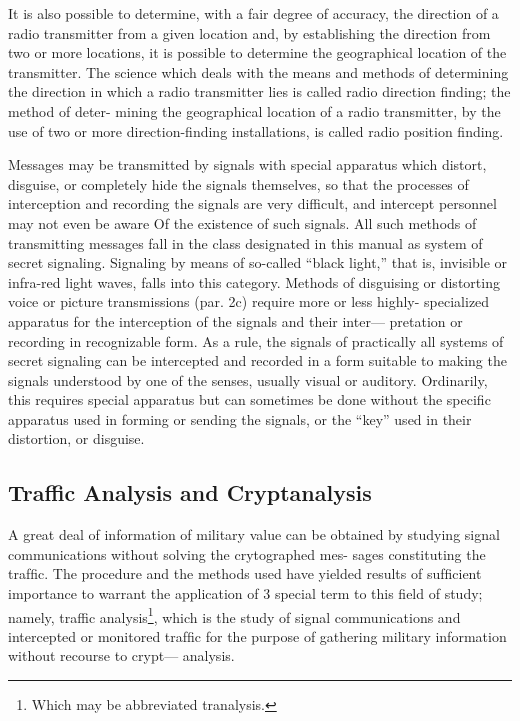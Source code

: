 \mypara It is also possible to determine, with a fair degree of accuracy, the
direction of a radio transmitter from a given location and, by establishing
the direction from two or more locations, it is possible to determine the
geographical location of the transmitter. The science which deals with
the means and methods of determining the direction in which a radio
transmitter lies is called radio direction ﬁnding; the method of deter-
mining the geographical location of a radio transmitter, by the use of
two or more direction-ﬁnding installations, is called radio position
ﬁnding.

\mypara Messages may be transmitted by signals with special apparatus
which distort, disguise, or completely hide the signals themselves, so that
the processes of interception and recording the signals are very difficult,
and intercept personnel may not even be aware Of the existence of such
signals. All such methods of transmitting messages fall in the class
designated in this manual as system of secret signaling. Signaling by
means of so-called “black light,” that is, invisible or infra-red light
waves, falls into this category. Methods of disguising or distorting
voice or picture transmissions (par. 2c) require more or less highly-
specialized apparatus for the interception of the signals and their inter—
pretation or recording in recognizable form. As a rule, the signals of
practically all systems of secret signaling can be intercepted and recorded
in a form suitable to making the signals understood by one of the senses,
usually visual or auditory. Ordinarily, this requires special apparatus
but can sometimes be done without the speciﬁc apparatus used in forming
or sending the signals, or the “key” used in their distortion, or disguise.

\subsection{Traffic Analysis and Cryptanalysis}

\mypara A great deal of information of military value can be obtained by
studying signal communications without solving the crytographed mes-
sages constituting the trafﬁc. The procedure and the methods used have
yielded results of sufﬁcient importance to warrant the application of 3
special term to this ﬁeld of study; namely, traffic analysis\footnote{ Which may be abbreviated tranalysis.  }, which is the
study of signal communications and intercepted or monitored trafﬁc for
the purpose of gathering military information without recourse to crypt—
analysis.

